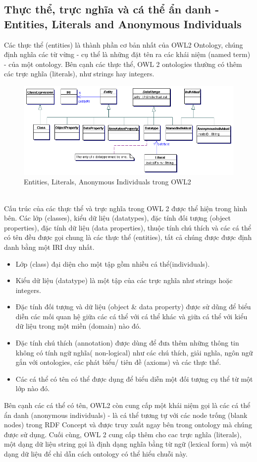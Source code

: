 \subsection{Thực thể, trực nghĩa và cá thể ẩn danh - Entities, Literals and Anonymous Individuals}
Các thực thể (entities) là thành phần cơ bản nhất của OWL2 Ontology, chúng định nghĩa các từ vừng - cụ thể là những đặt tên ra các khái niệm (named term) - của một ontology. Bên cạnh các thực thể, OWL 2 ontologies thường có thêm các trực nghĩa (literals), như strings hay integers.
\begin{figure}[ht!]
	\centering
	\includegraphics[width=140mm]{Figures/entities.png}
	\caption{Entities, Literals, Anonymous Individuals trong OWL2 \label{overflow}}
\end{figure}
\\
Cấu trúc của các thực thể và trực nghĩa trong OWL 2 được thể hiện trong hình bên. Các lớp (classes), kiểu dữ liệu (datatypes), đặc tính đối tượng (object properties), đặc tính dữ liệu (data properties), thuộc tính chú thích và các cá thể có tên đều được gọi chung là các thực thể (entities), tất cả chúng được được định danh bằng một IRI duy nhất. 
\begin{itemize}
\item Lớp (class) đại diện cho một tập gồm nhiều cá thể(individuals).
\item Kiểu dữ liệu (datatype) là một tập của các trực nghĩa như strings hoặc integers.
\item Đặc tính đối tượng và dữ liệu (object \& data property) được sử dũng để biểu diễn các mối quan hệ giữa các cá thể với cá thể khác và giữa cá thể với kiểu dữ liệu trong một miền (domain) nào đó.
\item Đặc tính chú thích (annotation) được dùng để đưa thêm những thông tin không có tính ngữ nghĩa( non-logical) như các chú thích, giải nghĩa, ngôn ngữ gắn với ontologies, các phát biểu/ tiên đề (axioms) và các thực thể.
\item  Các cá thể có tên có thể được dụng để biểu diễn một đối tượng cụ thể từ một lớp nào đó.
\end{itemize}
Bên cạnh các cá thể có tên, OWL2 còn cung cấp một khái niệm gọi là các cá thể ẩn danh (anonymous individuals) - là cá thể tương tự với các node trống (blank nodes) trong RDF Concept \cite{rdf_concept} và được truy xuất ngay bên trong ontology mà chúng được sử dụng. Cuối cùng, OWL 2 cung cấp thêm cho cac trực nghĩa (literals), một dạng dữ liệu string gọi là định dạng nghĩa bằng từ ngữ (lexical form) và một dạng dữ liệu để chỉ dẫn cách ontology có thể hiểu chuỗi này.
